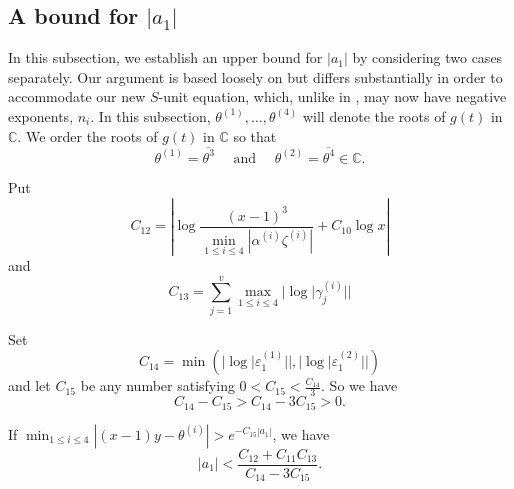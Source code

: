 
\subsection{A bound for $|a_1|$}

In this subsection, we establish an upper bound for $|a_1|$ by considering two cases separately. Our argument is based loosely on \cite{TW3} but differs substantially in order to accommodate our new $S$-unit equation, which, unlike in \cite{TW3}, may now have negative exponents, $n_i$. In this subsection, $\theta^{(1)}, \dots, \theta^{(4)}$ will denote the roots of $g(t)$ in $\mathbb{C}$. We order the roots of $g(t)$ in $\mathbb{C}$ so that
\[\theta^{(1)} = \overline{\theta^{3}} \quad \text{ and } \quad \theta^{(2)} = \overline{\theta^{4}} \in \mathbb{C}.\]



Put
\[C_{12} = \left|\log \frac{(x-1)^3}{\displaystyle \min_{1\leq i \leq 4} |\alpha^{(i)}\zeta^{(i)}|} + C_{10} \log{x}\right|\]
and 
\[C_{13} = \sum_{j = 1}^v \max_{1\leq i \leq 4} |\log|\gamma_j^{(i)}||\]


Set 
\[C_{14} = \min \left( |\log|\varepsilon_1^{(1)}||, |\log|\varepsilon_1^{(2)}||\right)\]
and let $C_{15}$ be any number satisfying $0 < C_{15} < \frac{C_{14}}{3}$.
So we have 
\[C_{14} - C_{15} > C_{14} - 3C_{15} > 0.\]

\begin{lemma}
If $\displaystyle \min_{1\leq i \leq 4}|(x-1)y-\theta^{(i)}| > e^{-C_{15}|a_1|}$, we have
\[|a_1|<  \frac{C_{12} + C_{11}C_{13}}{C_{14} - 3C_{15}} .\]
\end{lemma}

